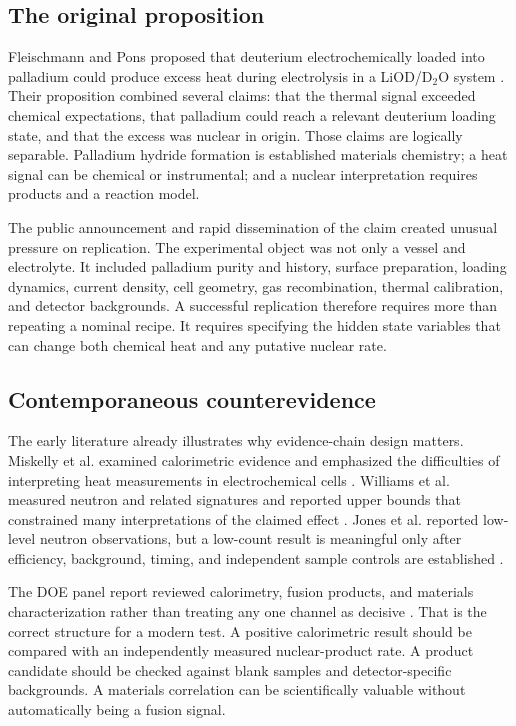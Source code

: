 \documentclass[conference]{IEEEtran}
\begin{document}
\subsection{The original proposition}
Fleischmann and Pons proposed that deuterium electrochemically loaded into palladium could produce excess heat during electrolysis in a LiOD/D$_2$O system \cite{fp1989}. Their proposition combined several claims: that the thermal signal exceeded chemical expectations, that palladium could reach a relevant deuterium loading state, and that the excess was nuclear in origin. Those claims are logically separable. Palladium hydride formation is established materials chemistry; a heat signal can be chemical or instrumental; and a nuclear interpretation requires products and a reaction model.

The public announcement and rapid dissemination of the claim created unusual pressure on replication. The experimental object was not only a vessel and electrolyte. It included palladium purity and history, surface preparation, loading dynamics, current density, cell geometry, gas recombination, thermal calibration, and detector backgrounds. A successful replication therefore requires more than repeating a nominal recipe. It requires specifying the hidden state variables that can change both chemical heat and any putative nuclear rate.

\subsection{Contemporaneous counterevidence}
The early literature already illustrates why evidence-chain design matters. Miskelly et al. examined calorimetric evidence and emphasized the difficulties of interpreting heat measurements in electrochemical cells \cite{miskelly1989}. Williams et al. measured neutron and related signatures and reported upper bounds that constrained many interpretations of the claimed effect \cite{williams1989}. Jones et al. reported low-level neutron observations, but a low-count result is meaningful only after efficiency, background, timing, and independent sample controls are established \cite{jones1989}.

The DOE panel report reviewed calorimetry, fusion products, and materials characterization rather than treating any one channel as decisive \cite{doe1989}. That is the correct structure for a modern test. A positive calorimetric result should be compared with an independently measured nuclear-product rate. A product candidate should be checked against blank samples and detector-specific backgrounds. A materials correlation can be scientifically valuable without automatically being a fusion signal.
\end{document}
